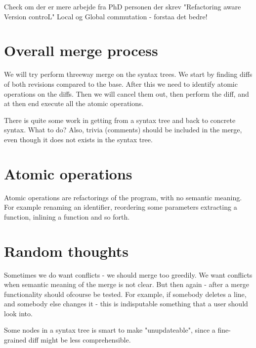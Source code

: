 \documentclass[12pt]{article}
\begin{document}
\maketitle

Check om der er mere arbejde fra PhD personen der skrev "Refactoring aware Version controL"
Local og Global commutation - forstaa det bedre!

\section{Overall merge process}
We will try perform threeway merge on the syntax trees. We start by finding diffs of both revisions compared to the base. After this we need to identify atomic operations on the diffs. Then we will cancel them out, then perform the diff, and at then end execute all the atomic operations.

There is quite some work in getting from a syntax tree and back to concrete syntax. What to do? Also, trivia (comments) should be included in the merge, even though it does not exists in the syntax tree.

\section{Atomic operations}
Atomic operations are refactorings of the program, with no semantic meaning. For example renaming an identifier, reordering some parameters extracting a function, inlining a function and so forth.

\section{Random thoughts}
Sometimes we do want conflicts - we should merge too greedily. We want conflicts when semantic meaning of the merge is not clear. But then again - after a merge functionality should ofcourse be tested. For example, if somebody deletes a line, and somebody else changes it - this is indisputable something that a user should look into.

Some nodes in a syntax tree is smart to make "unupdateable", since a fine-grained diff might be less comprehensible.	







\end{document}
